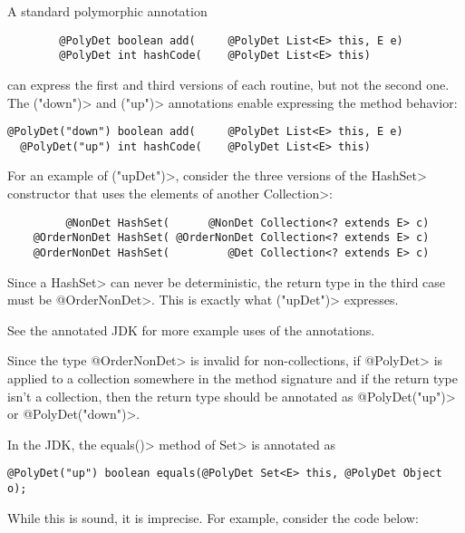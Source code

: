 A standard polymorphic annotation

\begin{Verbatim}
        @PolyDet boolean add(     @PolyDet List<E> this, E e)
        @PolyDet int hashCode(    @PolyDet List<E> this)
\end{Verbatim}

\noindent
can express the first and third versions of each routine, but not the
second one.  The \<("down")> and
\<("up")> annotations enable
expressing the method behavior:

\begin{Verbatim}
@PolyDet("down") boolean add(     @PolyDet List<E> this, E e)
  @PolyDet("up") int hashCode(    @PolyDet List<E> this)
\end{Verbatim}

For an example of \<("upDet")>,
consider the three versions of the \<HashSet> constructor that uses the elements
of another \<Collection>:

\begin{Verbatim}
         @NonDet HashSet(      @NonDet Collection<? extends E> c)
    @OrderNonDet HashSet( @OrderNonDet Collection<? extends E> c)
    @OrderNonDet HashSet(         @Det Collection<? extends E> c)
\end{Verbatim}

Since a \<HashSet> can never be deterministic, the return type in the third case
must be \<@OrderNonDet>. This is exactly what
\<("upDet")> expresses.

See the annotated JDK for more example uses of the annotations.

Since the type \<@OrderNonDet> is invalid for non-collections,
if \<@PolyDet> is applied to a collection somewhere in the method signature
and if the return type isn't a collection, then the return type should be
annotated as \<@PolyDet("up")> or \<@PolyDet("down")>.


In the JDK, the \<equals()> method of \<Set> is annotated as
\begin{Verbatim}
@PolyDet("up") boolean equals(@PolyDet Set<E> this, @PolyDet Object o);
\end{Verbatim}
While this is sound, it is imprecise.
For example, consider the code below:

